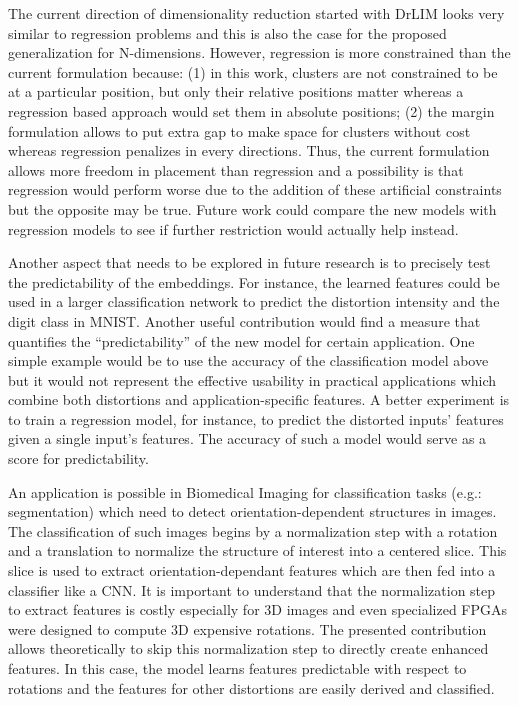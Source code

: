 \documentclass[a4paper,12pt]{report}
\newcommand{\eg}{e.g.}
\begin{document}
The current direction of dimensionality reduction started with DrLIM looks very similar to regression problems and this is also the case for the proposed generalization for N-dimensions.
However, regression is more constrained than the current formulation because: (1) in this work, clusters are not constrained to be at a particular position, but only their relative positions matter whereas a regression based approach would set them in absolute positions; (2) the margin formulation allows to put extra gap to make space for clusters without cost whereas regression penalizes in every directions.
Thus, the current formulation allows more freedom in placement than regression and a possibility is that regression would perform worse due to the addition of these artificial constraints but the opposite may be true.
Future work could compare the new models with regression models to see if further restriction would actually help instead.

Another aspect that needs to be explored in future research is to precisely test the predictability of the embeddings.
For instance, the learned features could be used in a larger classification network to predict the distortion intensity and the digit class in MNIST.
Another useful contribution would find a measure that quantifies the ``predictability'' of the new model for certain application.
One simple example would be to use the accuracy of the classification model above but it would not represent the effective usability in practical applications which combine both distortions and application-specific features.
A better experiment is to train a regression model, for instance, to predict the distorted inputs' features given a single input's features.
The accuracy of such a model would serve as a score for predictability.


An application is possible in Biomedical Imaging for classification tasks (\eg: segmentation) which need to detect orientation-dependent structures in images.
The classification of such images begins by a normalization step with a rotation and a translation to normalize the structure of interest into a centered slice.
This slice is used to extract orientation-dependant features which are then fed into a classifier like a CNN.
It is important to understand that the normalization step to extract features is costly especially for 3D images and even specialized FPGAs were designed to compute 3D expensive rotations.
The presented contribution allows theoretically to skip this normalization step to directly create enhanced features.
In this case, the model learns features predictable with respect to rotations and the features for other distortions are easily derived and classified.
\end{document}
